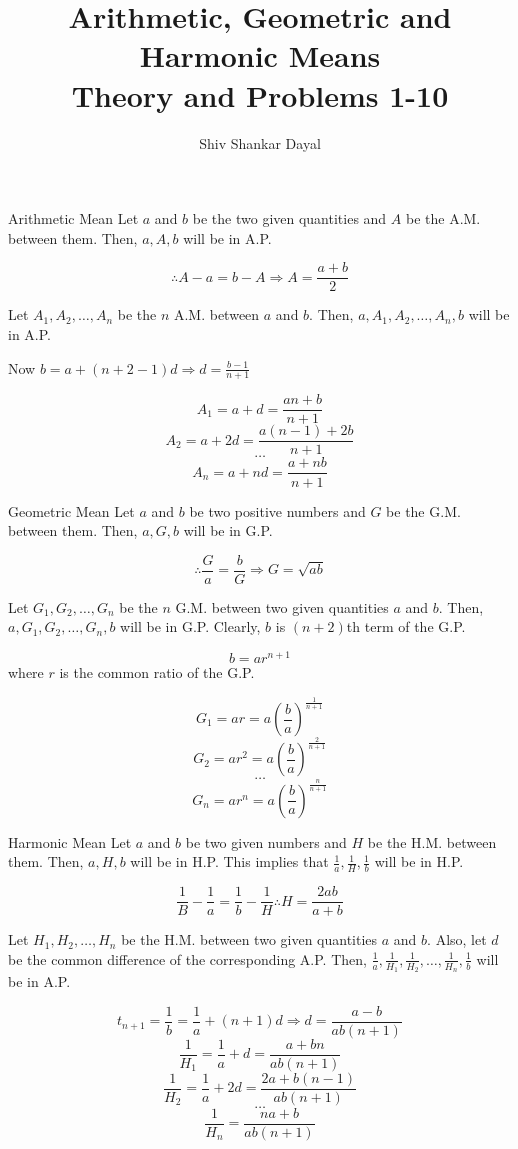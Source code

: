 \documentclass[aspectratio=1610,8pt]{beamer}
\title{Arithmetic, Geometric and Harmonic Means\\Theory and Problems 1-10}
\author[Shiv Shankar Dayal]{Shiv Shankar Dayal}
\begin{document}
\begin{frame}
  \titlepage
\end{frame}
\begin{frame}{Arithmetic Mean}
  Let $a$ and $b$ be the two given quantities and $A$ be the A.M. between
  them. Then, $a, A, b$ will be in A.P.

  $$\therefore A - a = b - A \Rightarrow A = \frac{a + b}{2}$$

  Let $A_1, A_2, \ldots,A_n$ be the $n$ A.M. between $a$ and $b.$ Then, $a, A_1,
  A_2, \ldots, A_n, b$ will be in A.P.

  Now $b = a + (n + 2 - 1)d \Rightarrow d = \frac{b - 1}{n + 1}$

  $$A_1 = a + d = \frac{an + b}{n + 1}$$
  $$A_2 = a + 2d = \frac{a(n - 1) + 2b}{n + 1}$$
  $$\ldots$$
  $$A_n = a + nd = \frac{a + nb}{n + 1}$$
\end{frame}
\begin{frame}{Geometric Mean}
Let $a$ and $b$ be two positive numbers and $G$ be the G.M. between them. Then,
$a, G, b$ will be in G.P.

$$\therefore \frac{G}{a} = \frac{b}{G}\Rightarrow G = \sqrt{ab}$$

Let $G_1, G_2, \ldots, G_n$ be the $n$ G.M. between two given quantities $a$
and $b.$ Then, $a, G_1, G_2, \ldots, G_n, b$ will be in G.P. Clearly, $b$ is
$(n + 2)$th term of the G.P.

$$b = ar^{n + 1}$$ where $r$ is the common ratio of the G.P.

$$G_1 = ar = a\left(\frac{b}{a}\right)^{\frac{1}{n + 1}}$$
$$G_2 = ar^2 = a\left(\frac{b}{a}\right)^{\frac{2}{n + 1}}$$
$$\ldots$$
$$G_n = ar^n = a\left(\frac{b}{a}\right)^{\frac{n}{n + 1}}$$
\end{frame}
\begin{frame}{Harmonic Mean}
Let $a$ and $b$ be two given numbers and $H$ be the H.M. between them. Then,
$a, H, b$ will be in H.P. This implies that $\frac{1}{a}, \frac{1}{H},
\frac{1}{b}$ will be in H.P.

$$\frac{1}{B} - \frac{1}{a} = \frac{1}{b} - \frac{1}{H} \therefore H =
\frac{2ab}{a + b}$$

Let $H_1, H_2, \ldots, H_n$ be the H.M. between two given quantities $a$ and
$b.$ Also, let $d$ be the common difference of the corresponding A.P. Then,
$\frac{1}{a}, \frac{1}{H_1}, \frac{1}{H_2}, \ldots, \frac{1}{H_n}, \frac{1}{b}$
will be in A.P.

$$t_{n + 1} = \frac{1}{b} = \frac{1}{a} + (n + 1)d \Rightarrow d = \frac{a -
  b}{ab(n + 1)}$$
$$\frac{1}{H_1} = \frac{1}{a} + d = \frac{a + bn}{ab(n + 1)}$$
$$\frac{1}{H_2} = \frac{1}{a} + 2d = \frac{2a + b(n - 1)}{ab(n + 1)}$$
$$\ldots$$
$$\frac{1}{H_n} = \frac{na + b}{ab(n + 1)}$$
\end{frame}
\end{document}
